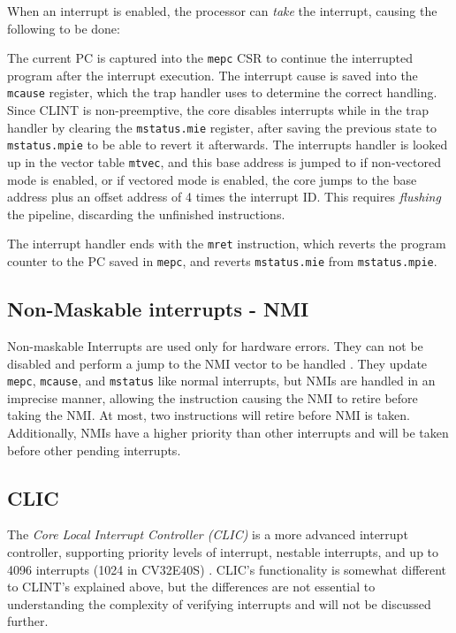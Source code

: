 When an interrupt is enabled, the processor can \textit{take} the interrupt, causing the following to be done:

The current PC is captured into the \lstinline{mepc} CSR to continue the interrupted program after the interrupt execution. 
The interrupt cause is saved into the \lstinline{mcause} register, which the trap handler uses to determine the correct handling.
Since CLINT is non-preemptive, the core disables interrupts while in the trap handler by clearing the \lstinline{mstatus.mie} register, after saving the previous state to \lstinline{mstatus.mpie} to be able to revert it afterwards. 
The interrupts handler is looked up in the vector table \lstinline{mtvec}, and this base address is jumped to if non-vectored mode is enabled, or if vectored mode is enabled, the core jumps to the base address plus an offset address of 4 times the interrupt ID. This requires \textit{flushing} the pipeline, discarding the unfinished instructions.


The interrupt handler ends with the \lstinline{mret} instruction, which reverts the program counter to the PC saved in \lstinline{mepc}, and reverts \lstinline{mstatus.mie} from \lstinline{mstatus.mpie}.

\subsection{Non-Maskable interrupts - NMI}

Non-maskable Interrupts are used only for hardware errors. They can not be disabled and perform a jump to the NMI vector to be handled \cite{watermanRISCVInstructionSet2021}. They update \lstinline{mepc}, \lstinline{mcause}, and \lstinline{mstatus} like normal interrupts, but NMIs are handled in an imprecise manner, allowing the instruction causing the NMI to retire before taking the NMI. At most, two instructions will retire before NMI is taken. 
Additionally, NMIs have a higher priority than other interrupts and will be taken before other pending interrupts. \cite{openhwgroupExceptionsInterruptsCOREV2023}

\subsection{CLIC}

The \textit{Core Local Interrupt Controller (CLIC)} is a more advanced interrupt controller, supporting priority levels of interrupt, nestable interrupts, and up to 4096 interrupts (1024 in CV32E40S) \cite{openhwgroupExceptionsInterruptsCOREV2023}. CLIC's functionality is somewhat different to CLINT's explained above, but the differences are not essential to understanding the complexity of verifying interrupts and will not be discussed further. 

